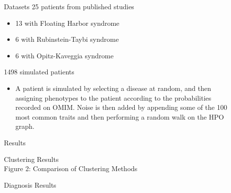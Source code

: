 \documentclass[final]{beamer} %
\begin{document}
\begin{frame}{}
\begin{columns}[T]
\begin{column}{0.3\linewidth}
    \end{column}

    \begin{column}{0.3\linewidth}
	\begin{block}{\Huge Datasets}
	\Large
		25 patients from published studies
		\begin{itemize}
			\item 13 with Floating Harbor syndrome
			\item 6 with Rubinstein-Taybi syndrome
			\item 6 with Opitz-Kaveggia syndrome
		\end{itemize}
		1498 simulated patients
		\begin{itemize}
			\item A patient is simulated by selecting a disease at random, and then assigning phenotypes to the patient according to the probabilities recorded on OMIM. Noise is then added by appending some of the 100 most common traits and then performing a random walk on the HPO graph. 
		\end{itemize}
	\end{block}
    \begin{block}{\Huge Results}
    \begin{block}{\Large Clustering Results }
      \centering
{} \\
   Figure 2: Comparison of Clustering Methods
    \end{block}

    \begin{block}{\Large Diagnosis Results}


\end{block}
\end{block}
\end{column}
\end{columns}
\end{frame}
\end{document}
